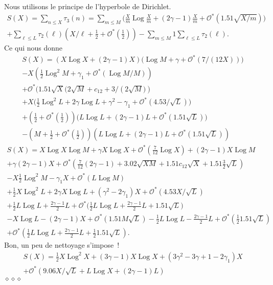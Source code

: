 \documentclass[12pt,a4paper,twoside]{article}
\newenvironment{dem}{\medbreak\noindent{\sc Preuve : }}%
{\hfill $\diamond\diamond\diamond$\par\medbreak}
\def\Ocal{\mathcal{O}}
\DeclareMathOperator{\Log}{Log}
\begin{document}
\begin{dem}
  Nous utilisons le principe de l'hyperbole de Dirichlet.
  \begin{multline*}
    S(X)=\sum_{n\le X}\tau_3(n)
    =
    \sum_{m\le M}\bigg(\frac{X}{m}\Log\frac{X}{m}
    +(2\gamma-1) \frac{X}m+\Ocal^*(1.51\sqrt{X/m})\bigg)
    \\+\sum_{\ell\le L}\tau_2(\ell)(X/\ell+\tfrac12+\Ocal^*(\tfrac12))
    -\sum_{m\le M}1\sum_{\ell\le L}\tau_2(\ell).
  \end{multline*}
  Ce qui nous donne
  \begin{multline*}
    S(X)=
    (X\Log X+(2\gamma-1)X)\bigl(\Log M+\gamma+\Ocal^*(7/(12X))\bigr)
    \\-X(\tfrac12\Log^2M+\gamma_1+\Ocal^*(\Log M /M))
    \\+\Ocal^*(1.51\sqrt{X}\bigl(2\sqrt{M}+c_{12}+3/(2\sqrt{M}\bigr))
    \\+X\bigl(\tfrac12\Log^2 L+2\gamma \Log L+
    \gamma^2-\gamma_1+\Ocal^*(4.53/\sqrt{L})\bigr)
    \\+(\tfrac12+\Ocal^*(\tfrac12))\bigl(L\Log L+(2\gamma-1)
    L+\Ocal^*(1.51\sqrt{L})\bigr)
    \\-(M+\tfrac12+\Ocal^*(\tfrac12))(L\Log L+(2\gamma-1)
    L+\Ocal^*(1.51\sqrt{L}))
  \end{multline*}
  \begin{multline*}
    S(X)=
    X\Log X\Log M+\gamma X\Log X+\Ocal^*(\tfrac7{12}\Log X)
    +(2\gamma-1)X\Log M\\+\gamma(2\gamma-1)X
    +\Ocal^*(\tfrac7{12}(2\gamma-1)+3.02\sqrt{XM}+1.51c_{12}\sqrt{X}+1.51\tfrac32\sqrt{L})
    \\-X\tfrac12\Log^2M-\gamma_1X+\Ocal^*(L\Log M)
    \\+\tfrac12X\Log^2 L+2\gamma X\Log L+
    (\gamma^2-2\gamma_1)X+\Ocal^*(4.53 X/\sqrt{L})
    \\+\tfrac12L\Log L+\frac{2\gamma-1}{2} L
    +\Ocal^*\bigl(\tfrac12L\Log L+\frac{2\gamma-1}{2}L+1.51\sqrt{L}\bigr)
    \\-X\Log L-(2\gamma-1) X+\Ocal^*(1.51 M\sqrt{L})
    -\tfrac12L\Log L-\frac{2\gamma-1}{2}L+\Ocal^*(\tfrac121.51\sqrt{L})
    \\+\Ocal^*(\tfrac12L\Log L+\frac{2\gamma-1}{2}L+\tfrac121.51\sqrt{L}).
  \end{multline*}
  Bon, un peu de nettoyage s'impose~!
    \begin{multline*}
    S(X)=
    \tfrac12X\Log^2 X
    +(3\gamma-1)X\Log X +(3\gamma^2-3\gamma+1 -2\gamma_1)X
    \\+\Ocal^*(9.06 X/\sqrt{L} +L\Log X+(2\gamma-1) L)

\end{multline*}
\end{dem}
\end{document}
